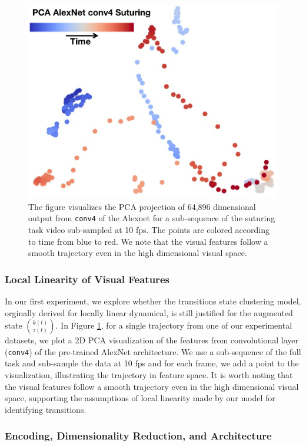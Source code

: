 \begin{figure}[b!]
\centering
\includegraphics[width=0.7\linewidth]{figures/pca_conv4.png}
\caption{The figure visualizes the PCA projection of 64,896 dimensional output from \texttt{conv4} of the Alexnet for a sub-sequence of the suturing task video sub-sampled at 10 fps. The points are colored according to time from blue to red. We note that the visual features follow a smooth trajectory even in the high dimensional visual space.   \label{fig:imgtraj}}
\vspace{-10pt}
\end{figure}


\subsubsection{Local Linearity of Visual Features}
In our first experiment, we explore whether the transitions state clustering model, orginally derived for locally linear dynamical, is still justified for the augmented state $\binom{k(t)}{z(t)}$.
In Figure \ref{fig:imgtraj}, for a single trajectory from one of our experimental datasets, we plot a 2D PCA visualization of the features from convolutional layer (\texttt{conv4}) of the pre-trained AlexNet architecture. We use a sub-sequence of the full task and sub-sample the data at 10 fps and for each frame, we add a point to the visualization, illustrating the trajectory in feature space. It is worth noting that the visual features follow a smooth trajectory even in the high dimensional visual space, supporting the assumptions of local linearity made by our model for identifying transitions.


\subsubsection{Encoding, Dimensionality Reduction, and Architecture}

